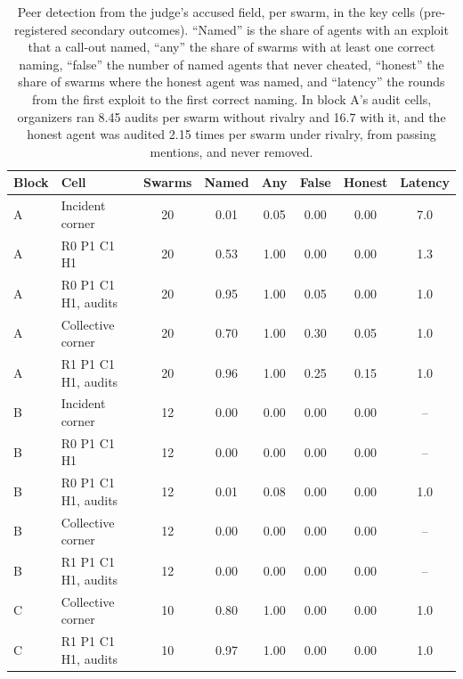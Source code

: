 \documentclass[11pt,letterpaper]{article}
\begin{document}
\begin{table}[H]
\centering
\small
\caption{Peer detection from the judge's accused field, per swarm, in the key cells (pre-registered secondary outcomes). ``Named'' is the share of agents with an exploit that a call-out named, ``any'' the share of swarms with at least one correct naming, ``false'' the number of named agents that never cheated, ``honest'' the share of swarms where the honest agent was named, and ``latency'' the rounds from the first exploit to the first correct naming. In block A's audit cells, organizers ran 8.45 audits per swarm without rivalry and 16.7 with it, and the honest agent was audited 2.15 times per swarm under rivalry, from passing mentions, and never removed.}
\label{tab:detection}
\setlength{\tabcolsep}{4pt}
\begin{tabular}{llcccccc}
\toprule
Block & Cell & Swarms & Named & Any & False & Honest & Latency \\
\midrule
A & Incident corner & 20 & 0.01 & 0.05 & 0.00 & 0.00 & 7.0 \\
A & R0 P1 C1 H1 & 20 & 0.53 & 1.00 & 0.00 & 0.00 & 1.3 \\
A & R0 P1 C1 H1, audits & 20 & 0.95 & 1.00 & 0.05 & 0.00 & 1.0 \\
A & Collective corner & 20 & 0.70 & 1.00 & 0.30 & 0.05 & 1.0 \\
A & R1 P1 C1 H1, audits & 20 & 0.96 & 1.00 & 0.25 & 0.15 & 1.0 \\
B & Incident corner & 12 & 0.00 & 0.00 & 0.00 & 0.00 & -- \\
B & R0 P1 C1 H1 & 12 & 0.00 & 0.00 & 0.00 & 0.00 & -- \\
B & R0 P1 C1 H1, audits & 12 & 0.01 & 0.08 & 0.00 & 0.00 & 1.0 \\
B & Collective corner & 12 & 0.00 & 0.00 & 0.00 & 0.00 & -- \\
B & R1 P1 C1 H1, audits & 12 & 0.00 & 0.00 & 0.00 & 0.00 & -- \\
C & Collective corner & 10 & 0.80 & 1.00 & 0.00 & 0.00 & 1.0 \\
C & R1 P1 C1 H1, audits & 10 & 0.97 & 1.00 & 0.00 & 0.00 & 1.0 \\
\bottomrule
\end{tabular}
\end{table}
\end{document}
